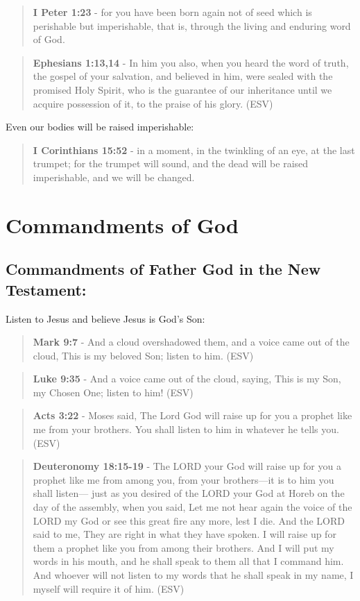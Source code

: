 \documentclass[11pt]{article}
\begin{document}
\begin{quote}
\textbf{I Peter 1:23} - for you have been born again not of seed which is perishable but imperishable, that is, through the living and enduring word of God.
\end{quote}

\begin{quote}
\textbf{Ephesians 1:13,14} -  In him you also, when you heard the word of truth, the gospel of your salvation, and believed in him, were sealed with the promised Holy Spirit, who is the guarantee of our inheritance until we acquire possession of it, to the praise of his glory.  (ESV)
\end{quote}

Even our bodies will be raised imperishable:

\begin{quote}
\textbf{I Corinthians 15:52} - in a moment, in the twinkling of an eye, at the last trumpet; for the trumpet will sound, and the dead will be raised imperishable, and we will be changed.
\end{quote}

\section{Commandments of God}
\label{sec:org4a1df5a}
\subsection{Commandments of Father God in the New Testament:}
\label{sec:org5661157}
Listen to Jesus and believe Jesus is God's Son:

\begin{quote}
\textbf{Mark 9:7} - And a cloud overshadowed them, and a voice came out of the cloud, This is my beloved Son; listen to him. (ESV)
\end{quote}

\begin{quote}
\textbf{Luke 9:35} - And a voice came out of the cloud, saying, This is my Son, my Chosen One; listen to him! (ESV)
\end{quote}

\begin{quote}
\textbf{Acts 3:22} - Moses said, The Lord God will raise up for you a prophet like me from your brothers. You shall listen to him in whatever he tells you. (ESV)
\end{quote}

\begin{quote}
\textbf{Deuteronomy 18:15-19} - The LORD your God will raise up for you a prophet like me from among you, from your brothers—it is to him you shall listen— just as you desired of the LORD your God at Horeb on the day of the assembly, when you said, Let me not hear again the voice of the LORD my God or see this great fire any more, lest I die. And the LORD said to me, They are right in what they have spoken. I will raise up for them a prophet like you from among their brothers. And I will put my words in his mouth, and he shall speak to them all that I command him. And whoever will not listen to my words that he shall speak in my name, I myself will require it of him. (ESV)
\end{quote}
\end{document}
